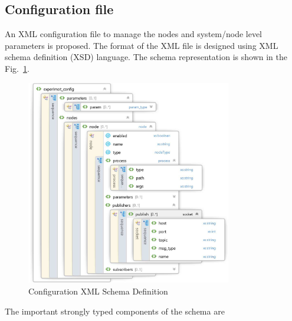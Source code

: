\subsection{Configuration file}
\label{sec:config_file}
An XML configuration file to manage the nodes and system/node level parameters is proposed. The format of the XML file is designed using XML schema definition (XSD) language. The schema representation is shown in the Fig.~\ref{fig:config_xsd}. 
\begin{figure}[H]
\centering
\includegraphics[width=0.8\textwidth]{assets/xsd_config.eps}
\caption[Configuration XML Schema Definition]{Configuration XML Schema Definition}
\label{fig:config_xsd}
\end{figure}
The important strongly typed components of the schema are
